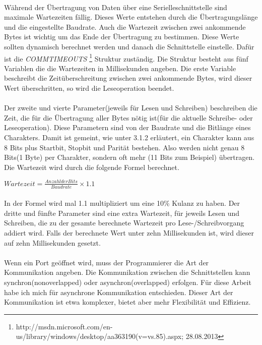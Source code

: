 \paragraph{}
Während der Übertragung von Daten über eine Serielleschnittstelle sind maximale Wartezeiten fällig. Dieses Werte entstehen durch die Übertragungslänge und die eingestellte Baudrate. Auch die Wartezeit zwischen zwei ankommende Bytes ist wichtig um das Ende der Übertragung zu bestimmen. Diese Werte sollten dynamisch berechnet werden und danach die Schnittstelle einstelle. Dafür ist die \textit{COMMTIMEOUTS} \footnote{http://msdn.microsoft.com/en-us/library/windows/desktop/aa363190(v=vs.85).aspx; 28.08.2013} Struktur zuständig. Die Struktur besteht aus fünf Variablen die die Wartezeiten in Millisekunden angeben. Die erste Variable beschreibt die Zeitüberschreitung zwischen zwei ankommende Bytes, wird dieser Wert überschritten, so wird die Leseoperation beendet.

\paragraph{}
Der zweite und vierte Parameter(jeweils für Lesen und Schreiben) beschreiben die Zeit, die für die Übertragung aller Bytes nötig ist(für die aktuelle Schreibe- oder Leseoperation). Diese Parametern sind von der Baudrate und die Bitlänge eines Charakters. Damit ist gemeint, wie unter 3.1.2 erläutert, ein Charakter kann aus 8 Bits plus Startbit, Stopbit und Parität bestehen. Also werden nicht genau 8 Bits(1 Byte) per Charakter, sondern oft mehr (11 Bits zum Beispiel) übertragen. Die Wartezeit wird durch die folgende Formel berechnet.

\begin{center}
$ Wartezeit = \frac{Anzahl der Bits}{Baudrate} \times 1.1$
\end{center}

\paragraph{}
In der Formel wird mal 1.1 multipliziert um eine 10\% Kulanz zu haben. Der dritte und fünfte Parameter sind eine extra Wartezeit, für jeweils Lesen und Schreiben, die zu der gesamte berechnete Wartezeit pro Lese-/Schreibvorgang addiert wird. Falls der berechnete Wert unter zehn Millisekunden ist, wird dieser auf zehn Millisekunden gesetzt.


\paragraph{}
Wenn ein Port geöffnet wird, muss der Programmierer die Art der Kommunikation angeben. Die Kommunikation zwischen die Schnittstellen kann synchron(nonoverlapped) oder asynchron(overlapped) erfolgen. Für diese Arbeit habe ich mich für asynchrone Kommunikation entschieden. Dieser Art der Kommunikation ist etwa komplexer, bietet aber mehr Flexibilität und Effizienz.




